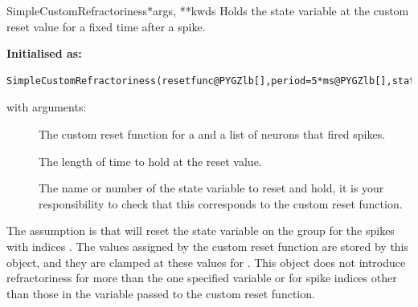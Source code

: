 \documentclass[letterpaper,10pt,english]{manual}
\begin{document}
\hypertarget{brian.SimpleCustomRefractoriness}{}\begin{classdesc}{SimpleCustomRefractoriness}{*args, **kwds}
Holds the state variable at the custom reset value for a fixed time after a spike.

\textbf{Initialised as:}

\begin{Verbatim}[commandchars=@\[\]]
SimpleCustomRefractoriness(resetfunc@PYGZlb[],period=5*ms@PYGZlb[],state=0@PYGZrb[]@PYGZrb[])
\end{Verbatim}

with arguments:
\begin{description}
\item[]
The custom reset function  for  a
\hyperlink{brian.NeuronGroup}{} and  a list of neurons that
fired spikes.

\item[]
The length of time to hold at the reset value.

\item[]
The name or number of the state variable to reset and hold,
it is your responsibility to check that this corresponds to
the custom reset function.

\end{description}

The assumption is that  will reset the state
variable  on the group  for the spikes with indices
. The values assigned by the custom reset function are
stored by this object, and they are clamped at these values for
. This object does not introduce refractoriness for more
than the one specified variable  or for spike indices
other than those in the variable  passed to the custom
reset function.
\end{classdesc}
\end{document}
